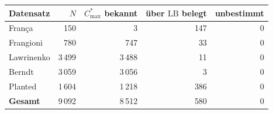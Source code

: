 \begin{tabular}{l r r r r}
\toprule
Datensatz & $N$ & $C^{*}_{\max}$ bekannt & über $\mathrm{LB}$ belegt & unbestimmt \\
\midrule
França & 150 & 3 & 147 & 0 \\
Frangioni & 780 & 747 & 33 & 0 \\
Lawrinenko & 3\,499 & 3\,488 & 11 & 0 \\
Berndt & 3\,059 & 3\,056 & 3 & 0 \\
Planted & 1\,604 & 1\,218 & 386 & 0 \\
\midrule
\textbf{Gesamt} & 9\,092 & 8\,512 & 580 & 0 \\
\bottomrule
\end{tabular}
